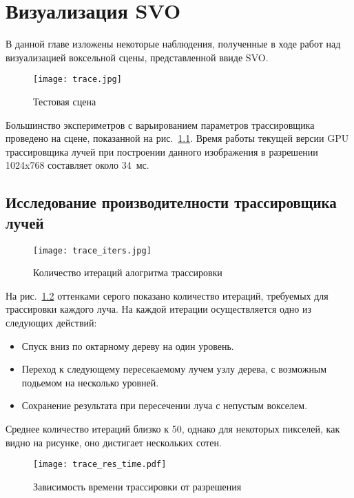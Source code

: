 \chapter{Визуализация SVO}

В данной главе изложены некоторые наблюдения, полученные в ходе работ над визуализацией воксельной сцены, представленной ввиде SVO.

\begin{figure}[h]
\center
\texttt{[image: trace.jpg]}
\caption{Тестовая сцена}
\label{fig:trace}
\end{figure}

Большинство экспериметров с варьированием параметров трассировщика проведено на сцене, показанной на рис.~\ref{fig:trace}. Время работы текущей версии GPU трассировщика лучей при построении данного изображения в разрешении 1024x768 составляет около 34~мс. 

\section{Исследование производителности трассировщика лучей}

\begin{figure}[h]
\center
\texttt{[image: trace\_iters.jpg]}
\caption{Количество итераций алогритма трассировки}
\label{fig:trace_iters}
\end{figure}

На рис.~\ref{fig:trace_iters} оттенками серого показано количество итераций, требуемых для трассировки каждого луча. На каждой итерации осуществляется одно из следующих действий:

\begin{itemize}
  \item Спуск вниз по октарному дереву на один уровень.
  \item Переход к следующему пересекаемому лучем узлу дерева, с возможным подьемом на несколько уровней.
  \item Сохранение результата при пересечении луча с непустым вокселем.
\end{itemize}

Среднее количество итераций близко к 50, однако для некоторых пикселей, как видно на рисунке, оно дистигает нескольких сотен.

\begin{figure}[h]
\center
\texttt{[image: trace\_res\_time.pdf]}
\caption{Зависимость времени трассировки от разрешения}
\label{fig:trace_res_time}
\end{figure}

